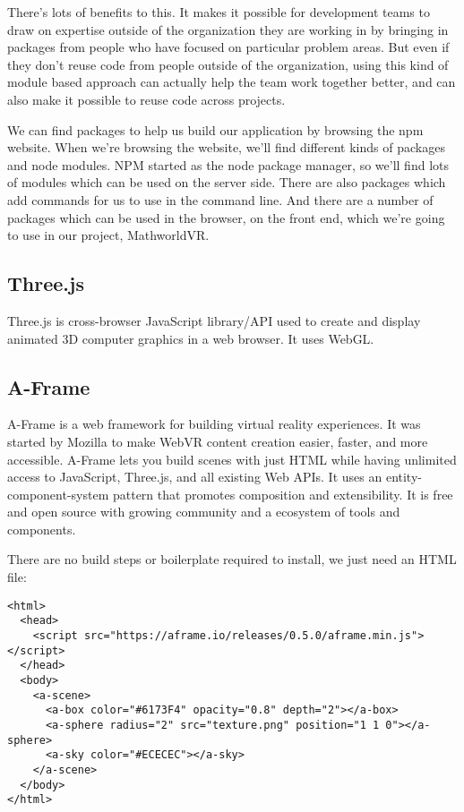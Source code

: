 There's lots of benefits to this. It makes it possible for development teams to draw on expertise outside of the organization they are working in by bringing in packages from people who have focused on particular problem areas. But even if they don't reuse code from people outside of the organization, using this kind of module based approach can actually help the team work together better, and can also make it possible to reuse code across projects.\cite{npm}

We can find packages to help us build our application by browsing the npm website. When we're browsing the website, we'll find different kinds of packages and node modules. NPM started as the node package manager, so we'll find lots of modules which can be used on the server side. There are also packages which add commands for us to use in the command line.\cite{npm} And there are a number of packages which can be used in the browser, on the front end, which we're going to use in our project, MathworldVR.

\subsection{Three.js}
Three.js is cross-browser JavaScript library/API used to create and display animated 3D computer graphics in a web browser. It uses WebGL.

\subsection{A-Frame}
A-Frame is a web framework for building virtual reality experiences. It was started by Mozilla to make WebVR content creation easier, faster, and more accessible. A-Frame lets you build scenes with just HTML while having unlimited access to JavaScript, Three.js, and all existing Web APIs. It uses an entity-component-system pattern that promotes composition and extensibility. It is free and open source with growing community and a ecosystem of tools and components. \cite{aframe-intro}

There are no build steps or boilerplate required to install, we just need an HTML file:

\lstset{basicstyle=\tiny,style=myCustomJavaScriptStyle}
\begin{lstlisting}[frame=single]
<html>
  <head>
    <script src="https://aframe.io/releases/0.5.0/aframe.min.js"></script>
  </head>
  <body>
    <a-scene>
      <a-box color="#6173F4" opacity="0.8" depth="2"></a-box>
      <a-sphere radius="2" src="texture.png" position="1 1 0"></a-sphere>
      <a-sky color="#ECECEC"></a-sky>
    </a-scene>
  </body>
</html>
\end{lstlisting}

